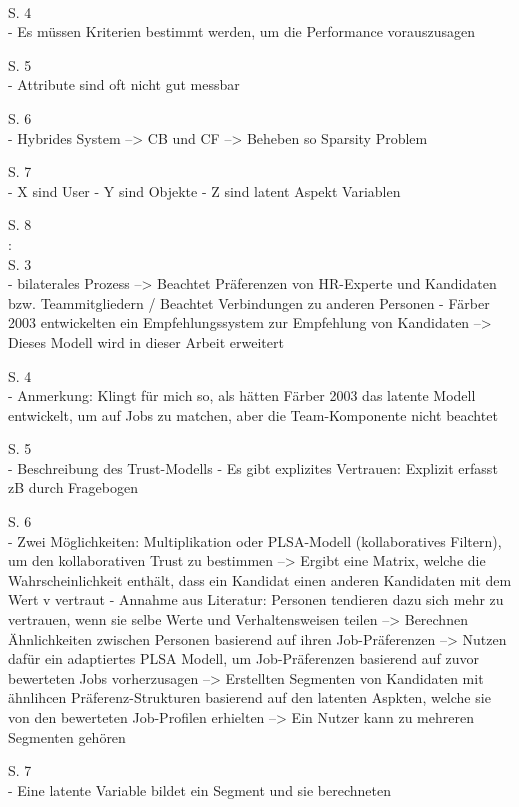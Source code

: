 \textcite{faerber:2003}\\
S. 4\\
- Es müssen Kriterien bestimmt werden, um die Performance vorauszusagen

S. 5\\
- Attribute sind oft nicht gut messbar

S. 6\\
- Hybrides System --> CB und CF --> Beheben so Sparsity Problem

S. 7\\
- X sind User
- Y sind Objekte
- Z sind latent Aspekt Variablen

S. 8\\


\textcite{malinowski:2005}:\\
S. 3\\
- bilaterales Prozess --> Beachtet Präferenzen von HR-Experte und Kandidaten bzw. Teammitgliedern / Beachtet Verbindungen zu anderen Personen
- Färber 2003 entwickelten ein Empfehlungssystem zur Empfehlung von Kandidaten --> Dieses Modell wird in dieser Arbeit erweitert

S. 4\\
- Anmerkung: Klingt für mich so, als hätten Färber 2003 das latente Modell entwickelt, um auf Jobs zu matchen, aber die Team-Komponente nicht beachtet

S. 5\\
- Beschreibung des Trust-Modells
- Es gibt explizites Vertrauen: Explizit erfasst zB durch Fragebogen

S. 6\\
- Zwei Möglichkeiten: Multiplikation oder PLSA-Modell (kollaboratives Filtern), um den kollaborativen Trust zu bestimmen --> Ergibt eine Matrix, welche die Wahrscheinlichkeit enthält, dass ein Kandidat einen anderen Kandidaten mit dem Wert v vertraut
- Annahme aus Literatur: Personen tendieren dazu sich mehr zu vertrauen, wenn sie selbe Werte und Verhaltensweisen teilen --> Berechnen Ähnlichkeiten zwischen Personen basierend auf ihren Job-Präferenzen --> Nutzen dafür ein adaptiertes PLSA Modell, um Job-Präferenzen basierend auf zuvor bewerteten Jobs vorherzusagen --> Erstellten Segmenten von Kandidaten mit ähnlihcen Präferenz-Strukturen basierend auf den latenten Aspkten, welche sie von den bewerteten Job-Profilen erhielten --> Ein Nutzer kann zu mehreren Segmenten gehören

S. 7\\
- Eine latente Variable bildet ein Segment und sie berechneten

